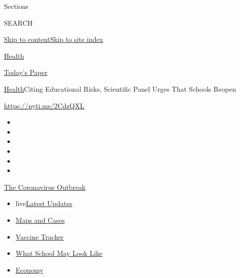 Sections

SEARCH

\protect\hyperlink{site-content}{Skip to
content}\protect\hyperlink{site-index}{Skip to site index}

\href{https://www.nytimes3xbfgragh.onion/section/health}{Health}

\href{https://myaccount.nytimes3xbfgragh.onion/auth/login?response_type=cookie\&client_id=vi}{}

\href{https://www.nytimes3xbfgragh.onion/section/todayspaper}{Today's
Paper}

\href{/section/health}{Health}\textbar{}Citing Educational Risks,
Scientific Panel Urges That Schools Reopen

\url{https://nyti.ms/2CdzQXL}

\begin{itemize}
\item
\item
\item
\item
\item
\item
\end{itemize}

\href{https://www.nytimes3xbfgragh.onion/news-event/coronavirus?action=click\&pgtype=Article\&state=default\&region=TOP_BANNER\&context=storylines_menu}{The
Coronavirus Outbreak}

\begin{itemize}
\tightlist
\item
  live\href{https://www.nytimes3xbfgragh.onion/2020/08/02/world/coronavirus-updates.html?action=click\&pgtype=Article\&state=default\&region=TOP_BANNER\&context=storylines_menu}{Latest
  Updates}
\item
  \href{https://www.nytimes3xbfgragh.onion/interactive/2020/us/coronavirus-us-cases.html?action=click\&pgtype=Article\&state=default\&region=TOP_BANNER\&context=storylines_menu}{Maps
  and Cases}
\item
  \href{https://www.nytimes3xbfgragh.onion/interactive/2020/science/coronavirus-vaccine-tracker.html?action=click\&pgtype=Article\&state=default\&region=TOP_BANNER\&context=storylines_menu}{Vaccine
  Tracker}
\item
  \href{https://www.nytimes3xbfgragh.onion/interactive/2020/07/29/us/schools-reopening-coronavirus.html?action=click\&pgtype=Article\&state=default\&region=TOP_BANNER\&context=storylines_menu}{What
  School May Look Like}
\item
  \href{https://www.nytimes3xbfgragh.onion/live/2020/07/31/business/stock-market-today-coronavirus?action=click\&pgtype=Article\&state=default\&region=TOP_BANNER\&context=storylines_menu}{Economy}
\end{itemize}

